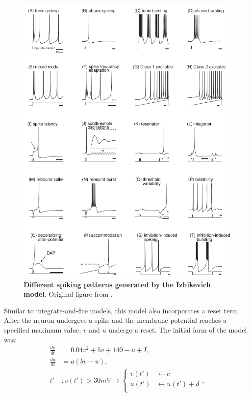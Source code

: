 \documentclass[../main.tex]{subfiles}
\begin{document}
\begin{figure}[!htb]
    \begin{center}
    \includegraphics[width=\textwidth]{chapter1/figures/Izhikevich_neuron_patterns.png}
    \caption{\textbf{Different spiking patterns generated by the Izhikevich model}.
    Original figure from \citep{izhikevich_dynamical_2007}.}
    \label{fig:neuron-dynamic-patterns}
    \end{center}
\end{figure}
Similar to integrate-and-fire models, this model also incorporates a reset term. 
After the neuron undergoes a spike and the membrane potential reaches a specified maximum value, $v$ and $u$ undergo a reset. 
The initial form of the model was:
\begin{equation}
    \begin{aligned}
        \displaystyle\frac{dv}{dt} &= 0.04v^2+5v+140 -u+ I,\\
        \displaystyle\frac{du}{dt} &= a(bv-u), \\
         t' &: v(t') > 30 mV \rightarrow 
         \begin{cases}
            v(t') &\leftarrow c\\
            u(t') &\leftarrow u(t') + d\\
        \end{cases},
    \end{aligned}
    \label{eq:izhikevich_adimensional}
\end{equation}
\end{document}
